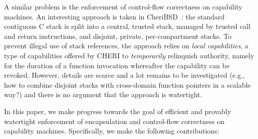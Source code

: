 \documentclass{llncs}
\begin{document}
A similar problem is the enforcement of control-flow correctness on capability
machines. An interesting approach is taken in CheriBSD~\cite{Watson2015Cheri}:
the standard contiguous C stack is split into a central, trusted stack, managed
by trusted call and return instructions, and disjoint, private, per-compartment
stacks. To prevent illegal use of stack references, the approach relies on
\emph{local capabilities}, a type of capabilities offered by CHERI to
\emph{temporarily} relinquish authority, namely for the duration of a function
invocation whereafter the capability can be revoked. However, details are scarce
and a lot remains to be investigated (e.g., how to combine disjoint stacks with
cross-domain function pointers in a scalable way?) and there is no argument that
the approach is watertight.

In this paper, we make progress towards the goal of efficient and provably
watertight enforcement of encapsulation and control-flow correctness on
capability machines. Specifically, we make the following contributions:
\end{document}

